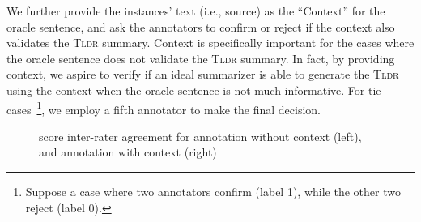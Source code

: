 \documentclass[11pt]{article}
\newcommand{\tldr}{\textsc{Tldr}}
\begin{document}
We further provide the instances' text (i.e., source) as the ``Context'' for the oracle sentence, and ask the annotators to confirm or reject if the context also validates the \tldr{} summary. Context is specifically important for the cases where the oracle sentence does not validate the \textsc{Tldr} summary. In fact, by providing context, we aspire to verify if an ideal summarizer is able to generate the \textsc{Tldr} using the context when the oracle sentence is not much informative. For tie cases~\footnote{Suppose a case where two annotators confirm (label 1), while the other two reject (label 0).}, we employ a fifth annotator to make the final decision. 
\begin{figure*}[t]
    \centering
    \footnotesize
{}
    \caption{ score inter-rater agreement for annotation without context (left), and annotation with context (right)}
    \label{fig:agreement_rate}
\end{figure*}
\begin{table}[h]
    \centering
    \caption{Average decision scores given by the annotators for each threshold.}
    \label{tab:ann_score}
\end{table}
\end{document}
